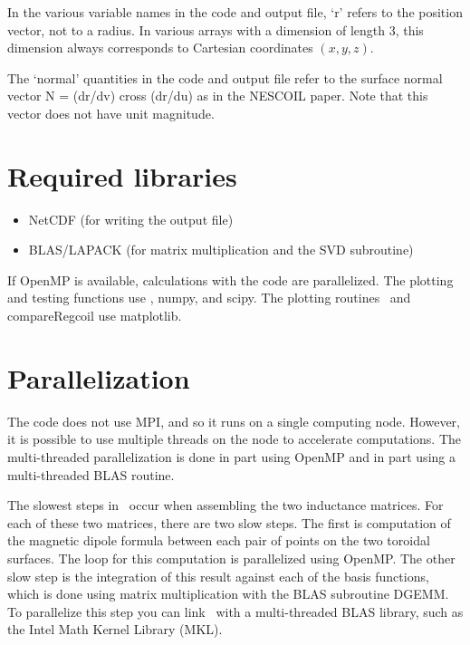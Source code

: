 In the various variable names in the code and output file, `r' refers
to the position vector, not to a radius.  In various arrays with a
dimension of length 3, this dimension always corresponds to Cartesian
coordinates $(x,y,z)$.

The `normal' quantities in the code and output file refer to the
surface normal vector N = (dr/dv) cross (dr/du) as in the NESCOIL
paper. Note that this vector does not have unit magnitude.



\section{Required libraries}

\begin{itemize}

\item {\ttfamily NetCDF} (for writing the output file)
\item {\ttfamily BLAS/LAPACK} (for matrix multiplication and the SVD subroutine)

\end{itemize}

If {\ttfamily OpenMP} is available, calculations with the code are parallelized.  The plotting and testing functions use \python,
{\ttfamily numpy}, and {\ttfamily scipy}.
The plotting routines \regcoilPlot~and {\ttfamily compareRegcoil} use {\ttfamily matplotlib}.

\section{Parallelization}

The code does not use {\ttfamily MPI}, and so it runs on a single computing node.  However, it is possible to use multiple threads
on the node to accelerate computations.  The multi-threaded parallelization is done in part using {\ttfamily OpenMP}
and in part using a multi-threaded {\ttfamily BLAS} routine.

The slowest steps in \regcoil~occur when assembling the two
inductance matrices.  For each of these two matrices, there are two slow steps.
The first is computation of the magnetic dipole formula between each pair of points
on the two toroidal surfaces.  The loop for this computation is parallelized using {\ttfamily OpenMP}.
The other slow step is the integration of this result against each of the basis functions,
which is done using matrix multiplication with the {\ttfamily BLAS} subroutine {\ttfamily DGEMM}.
To parallelize this step you can link \regcoil~with a multi-threaded  {\ttfamily BLAS} library,
such as the Intel Math Kernel Library (MKL).

